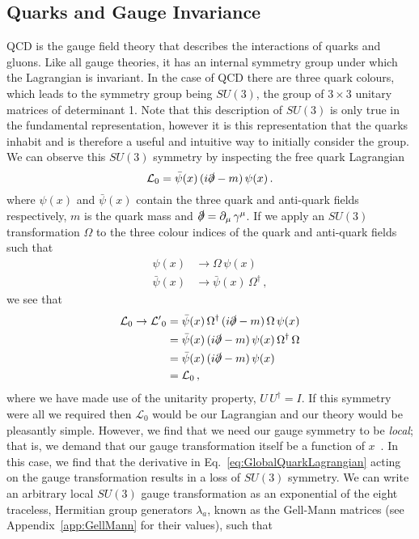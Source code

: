 \subsection{Quarks and Gauge Invariance}
QCD is the gauge field theory that describes the interactions of quarks and gluons. Like all gauge theories, it has an internal symmetry group under which the Lagrangian is invariant. In the case of QCD there are three quark colours, which leads to the symmetry group being $SU(3)$, the group of $3\times 3$ unitary matrices of determinant 1. Note that this description of $SU(3)$ is only true in the fundamental representation, however it is this representation that the quarks inhabit and is therefore a useful and intuitive way to initially consider the group. We can observe this $SU(3)$ symmetry by inspecting the free quark Lagrangian
%
\begin{equation}
\mathcal{L}_0 = \bar{\psi}(x)\,(i\slashed{\partial}-m)\,\psi(x)\,.
\label{eq:GlobalQuarkLagrangian}
\end{equation}
%
where $\psi(x)$ and $\bar{\psi}(x)$ contain the three quark and anti-quark fields respectively, $m$ is the quark mass and $\slashed{\partial}=\partial_\mu\,\gamma^\mu$. If we apply an $SU(3)$ transformation $\Omega$ to the three colour indices of the quark and anti-quark fields such that
%
\begin{align*}
\psi(x)&\rightarrow\Omega\,\psi(x)\\
\bar{\psi}(x)&\rightarrow \bar{\psi}(x)\,\Omega^\dagger\, ,
\end{align*}
%
we see that
%
\begin{align*}
\mathcal{L}_0\rightarrow\mathcal{L'}_0&=\bar{\psi}(x)\,\Omega^\dag\,(i\slashed{\partial}-m)\,\Omega\,\psi(x)\\
&= \bar{\psi}(x)\,(i\slashed{\partial}-m)\,\psi(x)\,\Omega^\dag\,\Omega\\
&= \bar{\psi}(x)\,(i\slashed{\partial}-m)\,\psi(x)\\
&= \mathcal{L}_0\, ,
\end{align*}
%
where we have made use of the unitarity property, $U\,U^\dag = I$. If this symmetry were all we required then $\mathcal{L}_0$ would be our Lagrangian and our theory would be pleasantly simple. However, we find that we need our gauge symmetry to be \textit{local}; that is, we demand that our gauge transformation itself be a function of $x$~\cite{peskin2018introduction}. In this case, we find that the derivative in Eq.~\ref{eq:GlobalQuarkLagrangian} acting on the gauge transformation results in a loss of $SU(3)$ symmetry. We can write an arbitrary local $SU(3)$ gauge transformation as an exponential of the eight traceless, Hermitian group generators $\lambda_a$, known as the Gell-Mann matrices (see Appendix~\ref{app:GellMann} for their values), such that 
